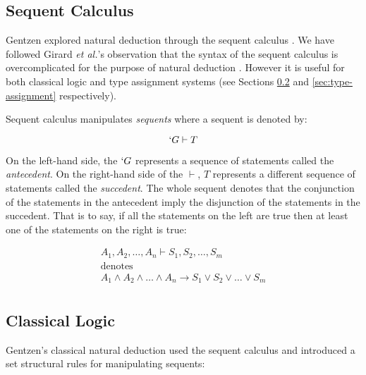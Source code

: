   \subsection{Sequent Calculus}
  
  Gentzen explored natural deduction through the sequent calculus \cite{Wadler15}.
  We have followed Girard \emph{et al.}'s observation that the syntax of the sequent calculus is overcomplicated for the purpose of natural deduction \cite{Girard89}.
  However it is useful for both classical logic and type assignment systems (see Sections \ref{sec:classical-logic} and \ref{sec:type-assignment} respectively).
  
  Sequent calculus manipulates \emph{sequents} where a sequent is denoted by:
  
    \[
      `G \vdash T
    \]
    
  On the left-hand side, the $`G$ represents a sequence of statements called the \emph{antecedent}.
  On the right-hand side of the $\vdash$, $T$ represents a different sequence of statements called the \emph{succedent}.
  The whole sequent denotes that the conjunction of the statements in the antecedent imply the disjunction of the statements in the succedent.
  That is to say, if all the statements on the left are true then at least one of the statements on the right is true:
  
  \[
    \begin{array}{c}
    A_1,A_2,\dots,A_n \vdash S_1,S_2,\dots,S_m \\
      \text{denotes} \\
    A_1 \wedge A_2 \wedge \dots \wedge A_n \to S_1 \lor S_2 \lor \dots \lor S_m \\
    \end{array}
  \]

  \subsection{Classical Logic}\label{sec:classical-logic}
  
  Gentzen's classical natural deduction used the sequent calculus and introduced a set structural rules for manipulating sequents:
  
